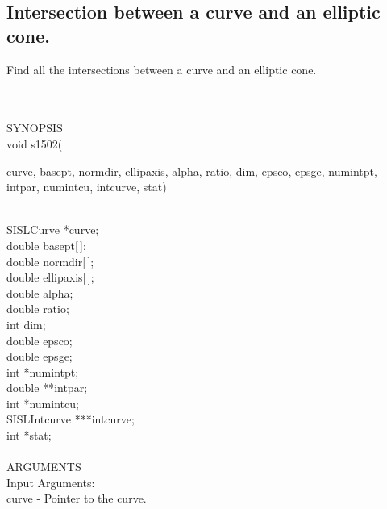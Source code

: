 \subsection{Intersection between a curve and an elliptic cone.}
\begin{minipg1}
  Find all the intersections between a curve and an elliptic cone.
\end{minipg1} \\ \\
SYNOPSIS\\
        \>void s1502(\begin{minipg3}
         {\fov curve}, {\fov basept}, {\fov normdir}, {\fov ellipaxis}, {\fov alpha}, {\fov ratio}, {\fov dim}, {\fov epsco}, {\fov epsge}, {\fov numintpt}, {\fov intpar},
                        {\fov numintcu}, {\fov intcurve}, {\fov stat})
                \end{minipg3}\\[0.3ex]
                \>\>    SISLCurve       \>      *{\fov curve};\\
                \>\>    double  \>      {\fov basept}[\,];\\
                \>\>    double  \>      {\fov normdir}[\,];\\
                \>\>    double  \>      {\fov ellipaxis}[\,];\\
                \>\>    double  \>      {\fov alpha};\\
                \>\>    double  \>      {\fov ratio};\\
                \>\>    int     \>      {\fov dim};\\
                \>\>    double  \>      {\fov epsco};\\
                \>\>    double  \>      {\fov epsge};\\
                \>\>    int     \>      *{\fov numintpt};\\
                \>\>    double  \>      **{\fov intpar};\\
                \>\>    int     \>      *{\fov numintcu};\\
                \>\>    SISLIntcurve \> ***{\fov intcurve};\\
                \>\>    int     \>      *{\fov stat};\\
\\
ARGUMENTS\\
        \>Input Arguments:\\
        \>\>    {\fov curve}    \> - \> Pointer to the curve.\\
